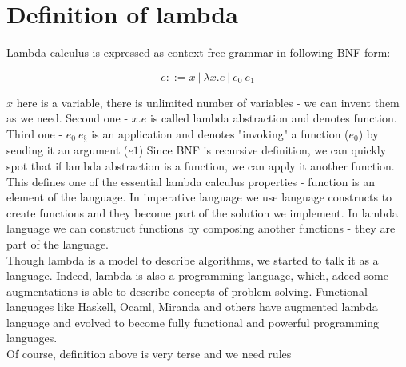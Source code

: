 \section{Definition of lambda}

Lambda calculus is expressed as context free grammar in following BNF form:

\[ e ::= x \ | \ \lambda{x}.{e} \ | \  e_0~e_1 \]

$x$ here is a variable, there is unlimited number of variables - we can invent them as we need. Second one - \lam${x}.{e}$ 
is called lambda abstraction and denotes function. Third one - $e_0~e_§$ is an application and denotes "invoking" a function ($e_0$)
by sending it an argument ($e1$)
Since BNF is recursive definition, we can quickly spot that if lambda abstraction is a function, we can apply it another function.
This defines one of the essential lambda calculus properties - function is an element of the language. In imperative language we use
language constructs to create functions and they become part of the solution we implement. In lambda language we can construct 
functions by composing another functions - they are part of the language.
\\
Though lambda is a model to describe algorithms, we started to talk it as a language. Indeed, lambda is also a programming language,
which, adeed some augmentations is able to describe concepts of problem solving. Functional languages like Haskell, Ocaml, Miranda and others
have augmented lambda language and evolved to become fully functional and powerful programming languages.
\\
Of course, definition above is very terse and we need rules


